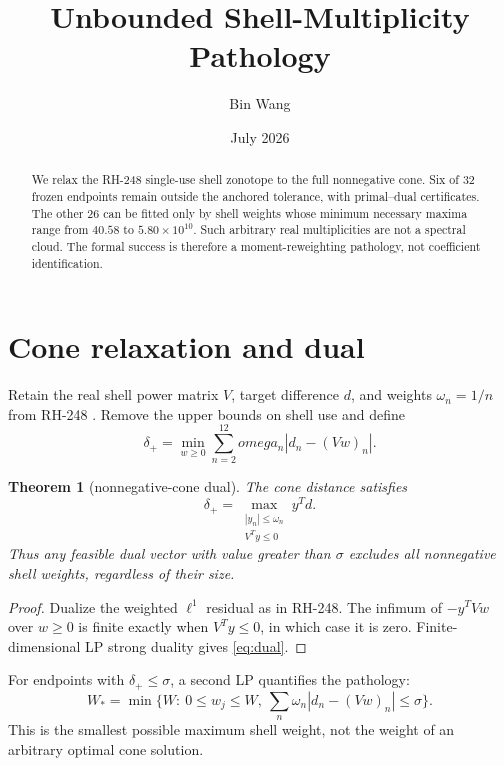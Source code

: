 \documentclass[11pt]{article}
\title{Unbounded Shell-Multiplicity Pathology}
\author{Bin Wang}
\date{July 2026}
\newtheorem{theorem}{Theorem}
\begin{document}
\maketitle

\begin{abstract}
We relax the RH-248 single-use shell zonotope to the full nonnegative cone.
Six of 32 frozen endpoints remain outside the anchored tolerance, with
primal--dual certificates.  The other 26 can be fitted only by shell weights
whose minimum necessary maxima range from $40.58$ to $5.80\times10^{10}$.
Such arbitrary real multiplicities are not a spectral cloud.  The formal
success is therefore a moment-reweighting pathology, not coefficient
identification.
\end{abstract}

\section{Cone relaxation and dual}

Retain the real shell power matrix $V$, target difference $d$, and weights
$\omega_n=1/n$ from RH-248 \citep{WangRH248}.  Remove the upper bounds on
shell use and define
\begin{equation}\label{eq:cone}
 \delta_+=\min_{w\ge0}\sum_{n=2}^{12}omega_n|d_n-(Vw)_n|.
\end{equation}

\begin{theorem}[nonnegative-cone dual]\label{thm:dual}
The cone distance satisfies
\begin{equation}\label{eq:dual}
 \delta_+=
 \max_{\substack{|y_n|\le\omega_n\\V^Ty\le0}}y^Td.
\end{equation}
Thus any feasible dual vector with value greater than $\sigma$ excludes all
nonnegative shell weights, regardless of their size.
\end{theorem}

\begin{proof}
Dualize the weighted $\ell^1$ residual as in RH-248.  The infimum of
$-y^TVw$ over $w\ge0$ is finite exactly when $V^Ty\le0$, in which case it is
zero.  Finite-dimensional LP strong duality gives \eqref{eq:dual}.
\end{proof}

For endpoints with $\delta_+\le\sigma$, a second LP quantifies the pathology:
\begin{equation}\label{eq:cap}
 W_*=\min\{W:\ 0\le w_j\le W,
 \ \sum_n\omega_n|d_n-(Vw)_n|\le\sigma\}.
\end{equation}
This is the smallest possible maximum shell weight, not the weight of an
arbitrary optimal cone solution.
\end{document}
